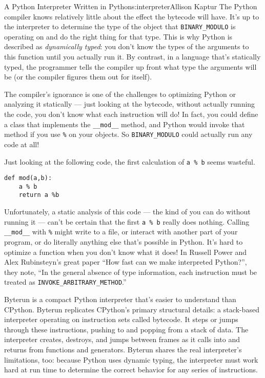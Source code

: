 \begin{aosachapter}{A Python Interpreter Written in Python}{s:interpreter}{Allison Kaptur}
The Python compiler knows relatively little about the effect the
bytecode will have. It's up to the interpreter to determine the type of
the object that \texttt{BINARY\_MODULO} is operating on and do the right
thing for that type. This is why Python is described as
\emph{dynamically typed}: you don't know the types of the arguments to
this function until you actually run it. By contrast, in a language
that's statically typed, the programmer tells the compiler up front what
type the arguments will be (or the compiler figures them out for
itself).

The compiler's ignorance is one of the challenges to optimizing Python
or analyzing it statically --- just looking at the bytecode, without
actually running the code, you don't know what each instruction will do!
In fact, you could define a class that implements the
\texttt{\_\_mod\_\_} method, and Python would invoke that method if you
use \texttt{\%} on your objects. So \texttt{BINARY\_MODULO} could
actually run any code at all!

Just looking at the following code, the first calculation of
\texttt{a \% b} seems wasteful.

\begin{verbatim}
def mod(a,b):
    a % b
    return a %b
\end{verbatim}

Unfortunately, a static analysis of this code --- the kind of you can do
without running it --- can't be certain that the first \texttt{a \% b}
really does nothing. Calling \texttt{\_\_mod\_\_} with \texttt{\%} might
write to a file, or interact with another part of your program, or do
literally anything else that's possible in Python. It's hard to optimize
a function when you don't know what it does! In Russell Power and Alex
Rubinsteyn's great paper ``How fast can we make interpreted Python?'',
they note, ``In the general absence of type information, each
instruction must be treated as \texttt{INVOKE\_ARBITRARY\_METHOD}.''

\label{conclusion}

Byterun is a compact Python interpreter that's easier to understand than
CPython. Byterun replicates CPython's primary structural details: a
stack-based interpreter operating on instruction sets called bytecode.
It steps or jumps through these instructions, pushing to and popping
from a stack of data. The interpreter creates, destroys, and jumps
between frames as it calls into and returns from functions and
generators. Byterun shares the real interpreter's limitations, too:
because Python uses dynamic typing, the interpreter must work hard at
run time to determine the correct behavior for any series of
instructions.


\end{aosachapter}
